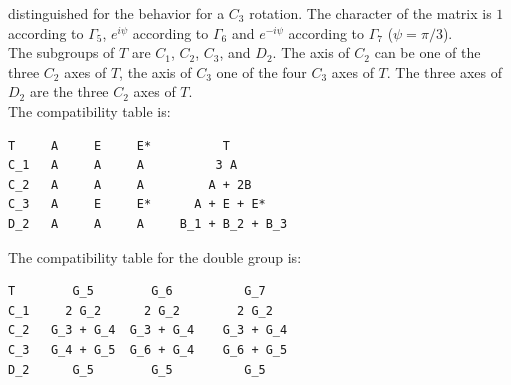 \documentclass[12pt,a4paper]{article}
\begin{document}
distinguished for the behavior for a $C_3$ rotation. The character of
the matrix is $1$ according to $\Gamma_5$, $e^{i\psi}$ according to $\Gamma_6$
and $e^{-i\psi}$ according to $\Gamma_7$ ($\psi=\pi/3$). \\
The subgroups of $T$ are $C_1$, $C_2$, $C_3$, and $D_2$. The axis of $C_2$
can be one of the three $C_2$ axes of $T$, the axis of $C_3$ one of the 
four $C_3$ axes of $T$. The three axes of $D_2$ are the three $C_2$ axes of
$T$. \\
The compatibility table is:
\begin{verbatim}
T     A     E     E*          T
C_1   A     A     A          3 A
C_2   A     A     A         A + 2B  
C_3   A     E     E*      A + E + E*
D_2   A     A     A     B_1 + B_2 + B_3
\end{verbatim}
The compatibility table for the double group is:
\begin{verbatim}
T        G_5        G_6          G_7   
C_1     2 G_2      2 G_2        2 G_2
C_2   G_3 + G_4  G_3 + G_4    G_3 + G_4
C_3   G_4 + G_5  G_6 + G_4    G_6 + G_5
D_2      G_5        G_5          G_5
\end{verbatim}
\end{document}
